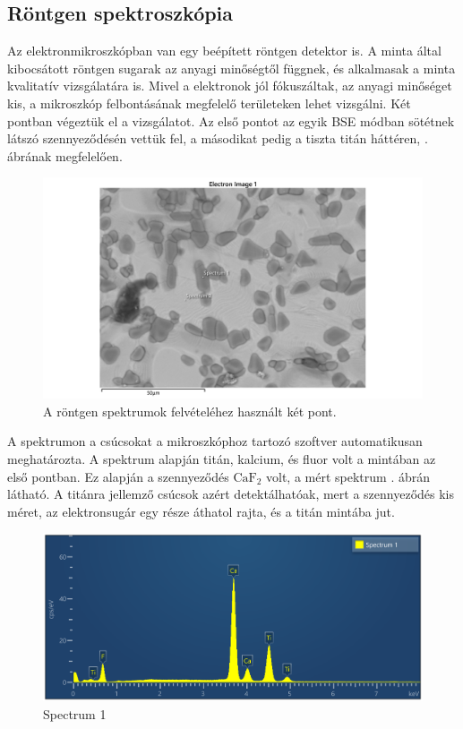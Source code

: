 \documentclass[pdftex,12pt,a4paper]{article}
\begin{document}
		\subsection{Röntgen spektroszkópia}
			Az elektronmikroszkópban van egy beépített röntgen detektor is. A minta által kibocsátott röntgen sugarak az anyagi minőségtől függnek, és alkalmasak a minta kvalitatív vizsgálatára is. Mivel a elektronok jól fókuszáltak, az anyagi minőséget kis, a mikroszkóp felbontásának megfelelő területeken lehet vizsgálni. Két pontban végeztük el a vizsgálatot. Az első pontot az egyik BSE módban sötétnek látszó szennyeződésén vettük fel, a másodikat pedig a tiszta titán háttéren, . ábrának megfelelően.
			\begin{figure}[H]
				\centering
				\includegraphics[scale=0.7]{./figs/spots.png}
				\caption{A röntgen spektrumok felvételéhez használt két pont.}
				\label{spots}
			\end{figure}
			A spektrumon a csúcsokat a mikroszkóphoz tartozó szoftver automatikusan meghatározta. A spektrum alapján titán, kalcium, és fluor volt a mintában az első pontban. Ez alapján a szennyeződés $\text{CaF}_2$ volt, a mért spektrum . ábrán látható. A titánra jellemző csúcsok azért detektálhatóak, mert a szennyeződés kis méret, az elektronsugár egy része áthatol rajta, és a titán mintába jut.
			\begin{figure}[H]
				\centering
				\includegraphics[scale=0.7]{./figs/spectrum1.png}
				\caption{Spectrum 1}
				\label{spectrum1}
			\end{figure}
\end{document}
